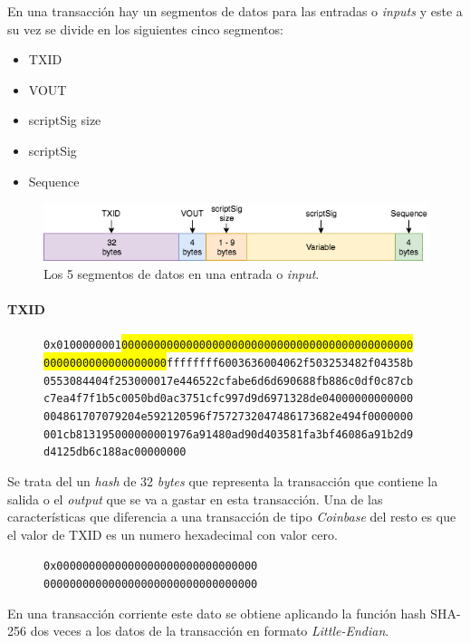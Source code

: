 \documentclass{article}
\begin{document}
    En una transacción hay un segmentos de datos para las entradas o \textit{inputs} y este a su vez se divide en los siguientes cinco segmentos:
    
    \begin{itemize}
    \item TXID
    \item VOUT
    \item scriptSig size
    \item scriptSig
    \item Sequence
    \end{itemize}
    
    \begin{figure}[H]
    \centering
        \includegraphics[scale=0.57]{img/Bitcoin_transactions_data_input.png}
        \caption{Los 5 segmentos de datos en una entrada o \textit{input}.}
    \end{figure}
    
    \paragraph{TXID}
    
    \begin{figure}[H]
        \texttt{0x0100000001\colorbox{Yellow}{000000000000000000000000000000000000000000000}} \\
        \texttt{\colorbox{Yellow}{0000000000000000000}ffffffff6003636004062f503253482f04358b} \\
        \texttt{0553084404f253000017e446522cfabe6d6d690688fb886c0df0c87cb} \\
        \texttt{c7ea4f7f1b5c0050bd0ac3751cfc997d9d6971328de04000000000000} \\
        \texttt{004861707079204e592120596f7572732047486173682e494f0000000} \\
        \texttt{001cb813195000000001976a91480ad90d403581fa3bf46086a91b2d9} \\
        \texttt{d4125db6c188ac00000000}
    \end{figure}
    
    Se trata del un \textit{hash} de 32 \textit{bytes} que representa la transacción que contiene la salida o el \textit{output} que se va a gastar en esta transacción. Una de las características que diferencia a una transacción de tipo \textit{Coinbase} del resto es que el valor de TXID es un numero hexadecimal con valor cero.
    \begin{figure}[H]
        \texttt{0x0000000000000000000000000000000} \\
        \texttt{000000000000000000000000000000000}
    \end{figure}
    En una transacción corriente este dato se obtiene aplicando la función hash SHA-256 dos veces a los datos de la transacción en formato \textit{Little-Endian}.
    
\end{document}
